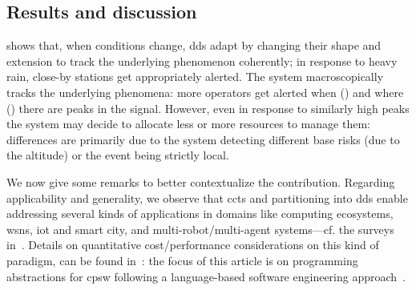\subsection{Results and discussion}\label{s:result-and-discussion}
 shows
that, when conditions change, \acp{dd} adapt by
changing their shape and extension to track the underlying phenomenon coherently;
in response to heavy rain,
close-by stations get appropriately alerted.
%
The system macroscopically tracks the underlying phenomena:
more operators get alerted when ()
and where ()
there are peaks in the signal.
%
However, even in response to similarly high peaks
the system may decide to allocate less or more resources to manage them:
differences are primarily due to the system detecting different base risks
(due to the altitude)
or the event being strictly local.

We now give some remarks to better contextualize the contribution.
%
Regarding applicability and generality,
 we observe that \acp{cct} and partitioning into \acp{dd}
 enable addressing several kinds of applications 
 in domains like 
 computing ecosystems,
 \acp{wsn},
 \ac{iot} and smart city,
 and multi-robot/multi-agent systems---cf. the surveys in~\cite{DBLP:journals/fgcs/PianiniCVN21,DBLP:journals/jlap/ViroliBDACP19}.
%
Details on quantitative cost/performance considerations on this kind of paradigm,
 can be found in~\cite{DBLP:journals/fgcs/PianiniCVN21,DBLP:journals/eaai/CasadeiVAPD21}: 
the focus of this article is on programming abstractions for \ac{cpsw}
 following a language-based software engineering approach~\cite{DBLP:journals/scp/Gupta15}.

